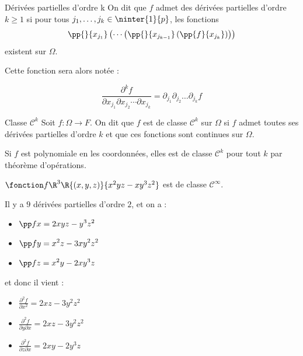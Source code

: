 \begin{proposition}{Dérivées partielles d'ordre k}{}
    On dit que $f$ admet des dérivées partielles d'ordre $k \geqslant 1$ si pour tous 
    $j_1, \dots, j_k \in \ninter{1}{p}$, les fonctions
    $$\pp{}{x_{j_1}} \left( \cdots \left( \pp{}{x_{j_{k - 1}}} \left( \pp{f}{x_{j_k}} \right) \right) \right)$$
    existent sur $\Omega$.

    Cette fonction sera alors notée :

    $$\frac{\partial^k f}{\partial x_{j_1} \partial x_{j_2} \cdots \partial x_{j_k}} = \partial_{j_1} \partial_{j_2} \dots \partial_{j_k} f$$
\end{proposition}

\begin{definition}{Classe $\mathscr C^k$}{}
    Soit $f : \Omega \to F$. On dit que $f$ est de classe $\mathscr C^k$ sur $\Omega$ si 
    $f$ admet toutes ses dérivées partielles d'ordre $k$ et que ces fonctions sont continues 
    sur $\Omega$.
\end{definition}

\begin{exemple}
    Si $f$ est polynomiale en les coordonnées, elles est de classe $\mathscr C^k$ pour tout 
    $k$ par théorème d'opérations. 

    $\fonction f {\R^3}\R{(x, y, z)}{x^2 y z - x y^3 z^2}$ est de classe $\mathscr C^\infty$.

    Il y a $9$ dérivées partielles d'ordre $2$, et on a : 
    \begin{itemize}
        \item $\displaystyle \pp f x = 2 x y z - y^3 z^2$
        \item $\displaystyle \pp f y = x^2 z - 3 x y^2 z^2$
        \item $\displaystyle \pp f z = x^2 y - 2 x y^3 z$
    \end{itemize}

    et donc il vient : 

    \begin{itemize}
        \item $\displaystyle \frac{\partial^2 f}{\partial x^2} = 2 x z - 3 y^2 z^2$
        \item $\displaystyle \frac{\partial^2 f}{\partial y \partial x} = 2 x z - 3 y^2 z^2$
        \item $\displaystyle \frac{\partial^2 f}{\partial z \partial x} = 2 x y - 2 y^3 z$
    \end{itemize}
\end{exemple}

